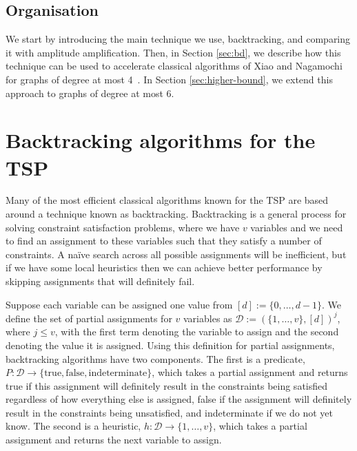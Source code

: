 \subsection{Organisation}

We start by introducing the main technique we use, backtracking, and comparing it with amplitude amplification. Then, in Section \ref{sec:bd}, we describe how this technique can be used to accelerate classical algorithms of Xiao and Nagamochi for graphs of degree at most 4~\cite{xiao2016degree3,xiao2016degree4}. In Section \ref{sec:higher-bound}, we extend this approach to graphs of degree at most 6.




\section{Backtracking algorithms for the TSP}
\label{sec:backtrack}

Many of the most efficient classical algorithms known for the TSP are based around a technique known as backtracking. Backtracking is a general process for solving constraint satisfaction problems, where we have $v$ variables and we need to find an assignment to these variables such that they satisfy a number of constraints. A na\"{i}ve search across all possible assignments will be inefficient, but if we have some local heuristics then we can achieve better performance by skipping assignments that will definitely fail.

Suppose each variable can be assigned one value from $[d] := \{0, \dots,d-1\}$. We define the set of partial assignments for $v$ variables as $\mathcal{D} := (\{1,\dots,v\}, [d])^j$, where $j \leq v$, with the first term denoting the variable to assign and the second denoting the value it is assigned. Using this definition for partial assignments, backtracking algorithms have two components. The first is a predicate, $P \colon \mathcal{D} \rightarrow \{\text{true}, \text{false}, \text{indeterminate}\}$, which takes a partial assignment and returns true if this assignment will definitely result in the constraints being satisfied regardless of how everything else is assigned, false if the assignment will definitely result in the constraints being unsatisfied, and indeterminate if we do not yet know. The second is a heuristic, $h \colon \mathcal{D} \rightarrow \{1,\dots,v\}$, which takes a partial assignment and returns the next variable to assign.

